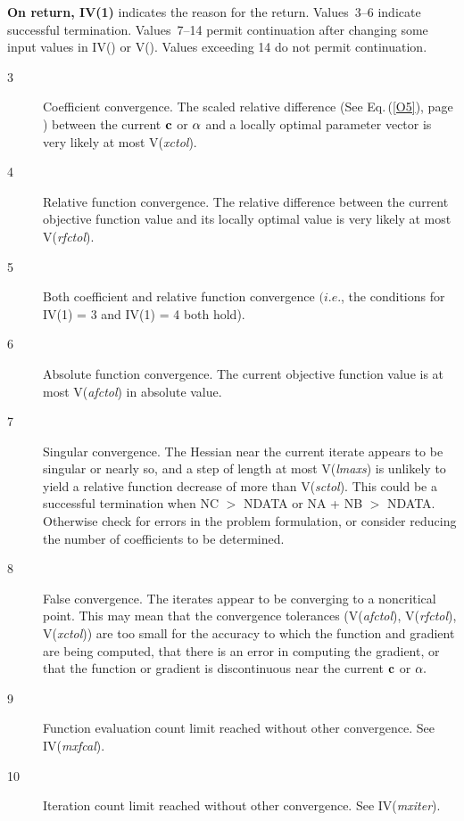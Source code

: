 \documentclass[twoside]{MATH77}
\begin{document}
{\bf On return, IV(1)} indicates the reason for the return. Values~3--6
indicate successful termination. Values~7--14 permit continuation after
changing some input values in IV() or V(). Values exceeding 14 do not permit
continuation.
\begin{description}
\item[3]  Coefficient convergence. The scaled relative
difference (See Eq.\,(\ref{O5}), page \pageref{O5}) between the current ${\bf %
c}$ or ${\bf \alpha }$ and a locally optimal parameter vector is very likely
at most V({\em xctol}).

\item[4]  Relative function convergence. The relative
difference between the current objective function value and its locally
optimal value is very likely at most V({\em rfctol}).

\item[5]  Both coefficient and relative function convergence $%
(i.e.$, the conditions for IV(1) = 3 and IV(1) = 4 both hold).

\item[6]  Absolute function convergence. The current
objective function value is at most V({\em afctol}) in absolute value.

\item[7]  Singular convergence. The Hessian near the current
iterate appears to be singular or nearly so, and a step of length at most
V({\em lmaxs}) is unlikely to yield a relative function decrease of more than
V({\em sctol}). This could be a successful termination when NC $>$ NDATA or NA +
NB $>$ NDATA. Otherwise check for errors in the problem formulation, or
consider reducing the number of coefficients to be determined.

\item[8]  False convergence. The iterates appear to be
converging to a noncritical point. This may mean that the convergence
tolerances (V({\em afctol}), V({\em rfctol}), V({\em xctol})) are too small for the accuracy
to which the function and gradient are being computed, that there is an
error in computing the gradient, or that the function or gradient is
discontinuous near the current ${\bf c}$ or ${\bf \alpha }.$

\item[9]  Function evaluation count limit reached without
other convergence. See IV({\em mxfcal}).

\item[10]  Iteration count limit reached without other
convergence. See IV({\em mxiter}).


\end{description}
\end{document}
